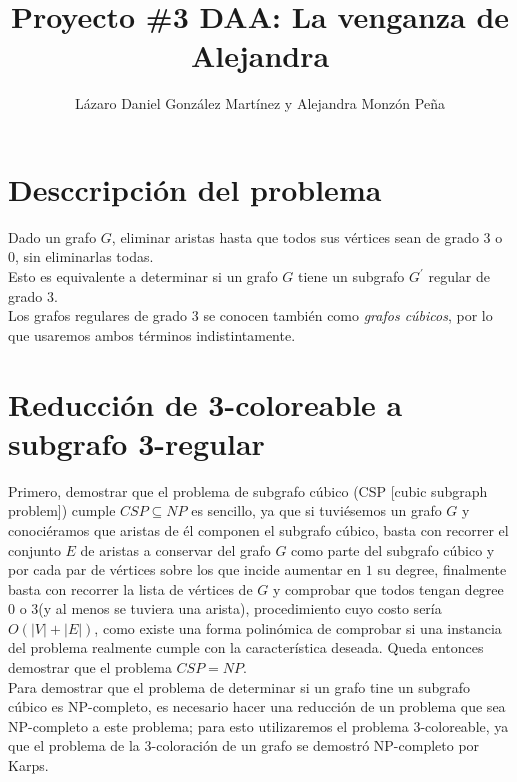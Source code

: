 \documentclass{article}
\begin{document}
\title{\textbf{Proyecto \#3 DAA:} La venganza de Alejandra}
\author{L\'azaro Daniel Gonz\'alez Mart\'inez y Alejandra Monz\'on Pe\~na}

\date{}
\maketitle

\section*{Desccripci\'on del problema}
Dado un grafo $G$, eliminar aristas hasta que todos sus v\'ertices sean de grado $3$ o $0$, sin eliminarlas todas.\\ 

Esto es equivalente a determinar si un grafo $G$ tiene un subgrafo $G^{'}$ regular de grado $3$. \\

Los grafos regulares de grado $3$ se conocen tambi\'en como \textit{grafos c\'ubicos}, por lo que usaremos ambos t\'erminos indistintamente.

\section*{Reducci\'on de 3-coloreable a subgrafo 3-regular}
Primero, demostrar que el problema de subgrafo c\'ubico (CSP [cubic subgraph problem]) cumple $ CSP \subseteq NP$ es sencillo, ya que si tuvi\'esemos un grafo $G$ y conoci\'eramos 
que aristas de \'el componen el subgrafo c\'ubico, basta con recorrer el conjunto $E$ de aristas a conservar del grafo $G$ como parte del subgrafo c\'ubico 
y por cada par de v\'ertices sobre los que incide aumentar en $1$ su degree, finalmente basta con recorrer la lista de v\'ertices de $G$ y comprobar que todos tengan degree 
$0$ o  $3$(y al menos se tuviera una arista), procedimiento cuyo costo ser\'ia $O(|V| + |E|)$, como existe una forma polin\'omica de comprobar si una instancia del problema realmente cumple con 
la caracter\'istica deseada. Queda entonces demostrar que el problema $CSP = NP$.\\

Para demostrar que el problema de determinar si un grafo tine un subgrafo c\'ubico es NP-completo, es necesario hacer una reducci\'on de un problema que sea NP-completo 
a este problema; para esto utilizaremos el problema $3$-coloreable, ya que el problema de la 3-coloraci\'on de un grafo se demostr\'o NP-completo por Karps.\\
\end{document}
